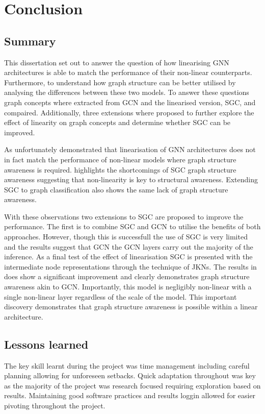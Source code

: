 \chapter{Conclusion}

\section{Summary}
This dissertation set out to answer the question of how linearising GNN architectures is able to match the performance of their non-linear counterparts.
Furthermore, to understand how graph structure can be better utilised by analysing the differences between these two models.
To answer these questions graph concepts where extracted from GCN and the linearised version, SGC, and compaired.
Additionally, three extensions where proposed to further explore the effect of linearity on graph concepts and determine whether SGC can be improved.

As  unfortunately demonstrated that linearisation of GNN architectures does not in fact match the performance of non-linear models where graph structure awareness is required.
 highlights the shortcomings of SGC graph structure awareness suggesting that non-linearity is key to structural awareness.
Extending SGC to graph classification also shows the same lack of graph structure awareness.

With these observations two extensions to SGC are proposed to improve the performance.
The first is to combine SGC and GCN to utilise the benefits of both approaches.
However, though this is successfull the use of SGC is very limited and the results suggest that GCN the GCN layers carry out the majority of the inference.
As a final test of the effect of linearisation SGC is presented with the intermediate node representations through the technique of JKNs\cite{xu2018representing}.
The results in  does show a significant improvement and clearly demonstrates graph structure awareness akin to GCN.
Importantly, this model is negligibly non-linear with a single non-linear layer regardless of the scale of the model.
This important discovery demonstrates that graph structure awareness is possible within a linear architecture.

\section{Lessons learned}
The key skill learnt during the project was time management including careful planning allowing for unforeseen setbacks.
Quick adaptation throughout was key as the majority of the project was research focused requiring exploration based on results.
Maintaining good software practices and results loggin allowed for easier pivoting throughout the project.

